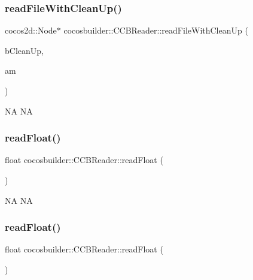 \subsubsection{\texorpdfstring{read\+File\+With\+Clean\+Up()}{readFileWithCleanUp()}\hspace{0.1cm}{\footnotesize\ttfamily [2/2]}}
{\footnotesize\ttfamily cocos2d\+::\+Node$\ast$ cocosbuilder\+::\+C\+C\+B\+Reader\+::read\+File\+With\+Clean\+Up (\begin{DoxyParamCaption}\item[{bool}]{b\+Clean\+Up,  }\item[{C\+C\+B\+Animation\+Manager\+Map\+Ptr}]{am }\end{DoxyParamCaption})}

NA  NA \mbox{\label{classcocosbuilder_1_1CCBReader_a6e205e174b2173124e27a8ef19ca283d}} 
\subsubsection{\texorpdfstring{read\+Float()}{readFloat()}\hspace{0.1cm}{\footnotesize\ttfamily [1/2]}}
{\footnotesize\ttfamily float cocosbuilder\+::\+C\+C\+B\+Reader\+::read\+Float (\begin{DoxyParamCaption}{ }\end{DoxyParamCaption})}

NA  NA \mbox{\label{classcocosbuilder_1_1CCBReader_a6e205e174b2173124e27a8ef19ca283d}} 
\subsubsection{\texorpdfstring{read\+Float()}{readFloat()}\hspace{0.1cm}{\footnotesize\ttfamily [2/2]}}
{\footnotesize\ttfamily float cocosbuilder\+::\+C\+C\+B\+Reader\+::read\+Float (\begin{DoxyParamCaption}{ }\end{DoxyParamCaption})}

